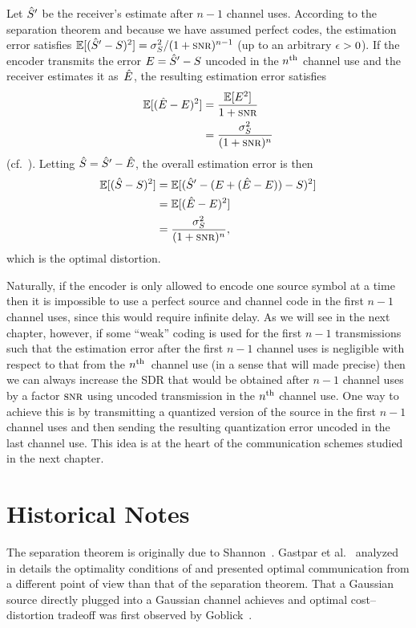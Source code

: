 Let ${\hat{S}}'$ be the receiver's estimate after $n-1$ channel uses. According to the
separation theorem and because we have assumed perfect codes,
the estimation error satisfies $\E[(\Sh' - S)^2] = \ssq / (1 + \snr)^{n-1}$ (up
to an arbitrary $\epsilon > 0$). If the encoder transmits the error $E = {\hat{S}}' - S$
uncoded in the $n{^{\text{th}}}$ channel use and the receiver estimates it as~$\hat{E}$, the
resulting estimation error satisfies
\begin{align*}
  \E[(\Eh - E)^2] &= \frac{\E[E^2]}{ 1 + \snr } \\
  &= \frac{\ssq}{(1 + \snr)^n}
\end{align*}
(cf.~).
Letting ${\hat{S}} = {\hat{S}}' - \hat{E}$, the overall estimation error is then 
\begin{align*}
  \E[(\Sh - S)^2] &= \E[(\Sh' - (E + (\Eh - E)) - S)^2] \\
  &= \E[(\Eh - E)^2] \\
  &= \frac{\ssq}{(1 + \snr)^n},
\end{align*}
which is the optimal distortion. 

Naturally, if the encoder is only allowed to encode one source symbol at a time
then it is impossible to use a perfect source and channel code in the first
$n-1$ channel uses, since this would require infinite delay. As we will see in
the next chapter, however, if some ``weak'' coding is used for the first $n-1$
transmissions such that the estimation error after the first $n-1$ channel uses
is negligible with respect to that from the $n{^{\text{th}}}$~channel use (in a sense that
will made precise) then we can always increase the SDR that
would be obtained after $n-1$ channel uses by a factor $\snr$ using uncoded
transmission in the $n{^{\text{th}}}$ channel use. One way to achieve this is by
transmitting a quantized version of the source in the first $n-1$ channel uses
and then sending the resulting quantization error uncoded in the last channel
use. This idea is at the heart of the communication schemes studied in the next
chapter.


\section{Historical Notes}

The separation theorem is originally due to Shannon~\cite{Shannon1948}. Gastpar
et al.~\cite{GastparRV2003} analyzed in details the optimality conditions of
 and presented optimal communication from a
different point of view than that of the separation theorem. That a Gaussian
source directly plugged into a Gaussian channel achieves and optimal
cost--distortion tradeoff was first observed by Goblick~\cite{Goblick1965}.

